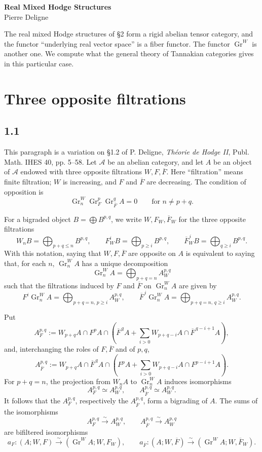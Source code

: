 \documentclass[11pt]{article}
\newcommand{\Gr}{\operatorname{Gr}}
\begin{document}
\begin{center}
 {\Large\bfseries Real Mixed Hodge Structures}\\[0.7em]
 {\large Pierre Deligne}
\end{center}

The real mixed Hodge structures of \S2 form a rigid abelian tensor category, and the functor ``underlying real vector space'' is a fiber functor.  The functor \(\Gr^W\) is another one.  We compute what the general theory of Tannakian categories gives in this particular case.

\section{Three opposite filtrations}

\subsection*{1.1}
This paragraph is a variation on \S1.2 of P. Deligne, \emph{Théorie de Hodge II}, Publ. Math. IHES 40, pp. 5--58.  Let \(\mathcal A\) be an abelian category, and let \(A\) be an object of \(\mathcal A\) endowed with three opposite filtrations \(W,F,\overline F\).  Here ``filtration'' means finite filtration; \(W\) is increasing, and \(F\) and \(\overline F\) are decreasing.  The condition of opposition is
\[
   \Gr^W_n\Gr^p_F\Gr^q_{\overline F} A=0
   \qquad\text{for } n\ne p+q .
\]

For a bigraded object \(B=\bigoplus B^{p,q}\), we write \(W,F_W,\overline F_W\) for the three opposite filtrations
\[
 W_nB=\bigoplus_{p+q\le n}B^{p,q},\qquad
 F_W^iB=\bigoplus_{p\ge i}B^{p,q},\qquad
 \overline F_W^{\,i}B=\bigoplus_{q\ge i}B^{p,q}.
\]
With this notation, saying that \(W,F,\overline F\) are opposite on \(A\) is equivalent to saying that, for each \(n\), \(\Gr^W_nA\) has a unique decomposition
\[
   \Gr^W_nA=\bigoplus_{p+q=n} A_W^{p,q}
\]
such that the filtrations induced by \(F\) and \(\overline F\) on \(\Gr^W_nA\) are given by
\[
 F^i\Gr^W_nA=\bigoplus_{p+q=n,\,p\ge i}A_W^{p,q},\qquad
 \overline F^{\,i}\Gr^W_nA=\bigoplus_{p+q=n,\,q\ge i}A_W^{p,q}.
\]

Put
\[
 A_F^{p,q}:=W_{p+q}A\cap F^pA\cap
 \left(\overline F^{\,q}A+\sum_{i>0}W_{p+q-i}A\cap \overline F^{\,q-i+1}A\right),
\]
and, interchanging the roles of \(F,\overline F\) and of \(p,q\),
\[
 A_{\overline F}^{p,q}:=W_{p+q}A\cap \overline F^{\,q}A\cap
 \left(F^pA+\sum_{i>0}W_{p+q-i}A\cap F^{p-i+1}A\right).
\]
For \(p+q=n\), the projection from \(W_nA\) to \(\Gr^W_nA\) induces isomorphisms
\[
 A_F^{p,q}\simeq A_W^{p,q},\qquad
 A_{\overline F}^{p,q}\simeq A_W^{p,q}.
\]
It follows that the \(A_F^{p,q}\), respectively the \(A_{\overline F}^{p,q}\), form a bigrading of \(A\).  The sums of the isomorphisms
\[
 A_F^{p,q}\xrightarrow{\sim}A_W^{p,q},\qquad
 A_{\overline F}^{p,q}\xrightarrow{\sim}A_W^{p,q}
\]
are bifiltered isomorphisms
\[
 a_F:(A;W,F)\xrightarrow{\sim}(\Gr^WA;W,F_W),
 \qquad
 a_{\overline F}:(A;W,\overline F)\xrightarrow{\sim}(\Gr^WA;W,\overline F_W).
\]
\end{document}
